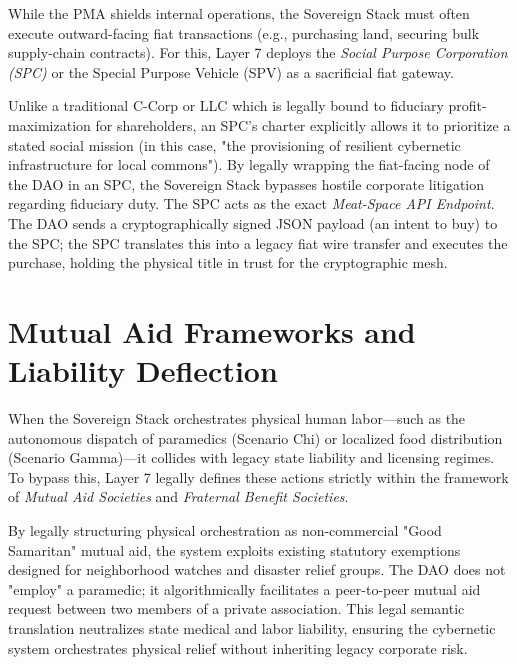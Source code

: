 While the PMA shields internal operations, the Sovereign Stack must often execute outward-facing fiat transactions (e.g., purchasing land, securing bulk supply-chain contracts). For this, Layer 7 deploys the \textit{Social Purpose Corporation (SPC)} or the Special Purpose Vehicle (SPV) as a sacrificial fiat gateway. 

Unlike a traditional C-Corp or LLC which is legally bound to fiduciary profit-maximization for shareholders, an SPC's charter explicitly allows it to prioritize a stated social mission (in this case, "the provisioning of resilient cybernetic infrastructure for local commons"). By legally wrapping the fiat-facing node of the DAO in an SPC, the Sovereign Stack bypasses hostile corporate litigation regarding fiduciary duty. The SPC acts as the exact \textit{Meat-Space API Endpoint}. The DAO sends a cryptographically signed JSON payload (an intent to buy) to the SPC; the SPC translates this into a legacy fiat wire transfer and executes the purchase, holding the physical title in trust for the cryptographic mesh.

\section{Mutual Aid Frameworks and Liability Deflection}

When the Sovereign Stack orchestrates physical human labor—such as the autonomous dispatch of paramedics (Scenario Chi) or localized food distribution (Scenario Gamma)—it collides with legacy state liability and licensing regimes. To bypass this, Layer 7 legally defines these actions strictly within the framework of \textit{Mutual Aid Societies} and \textit{Fraternal Benefit Societies}.

By legally structuring physical orchestration as non-commercial "Good Samaritan" mutual aid, the system exploits existing statutory exemptions designed for neighborhood watches and disaster relief groups. The DAO does not "employ" a paramedic; it algorithmically facilitates a peer-to-peer mutual aid request between two members of a private association. This legal semantic translation neutralizes state medical and labor liability, ensuring the cybernetic system orchestrates physical relief without inheriting legacy corporate risk.
